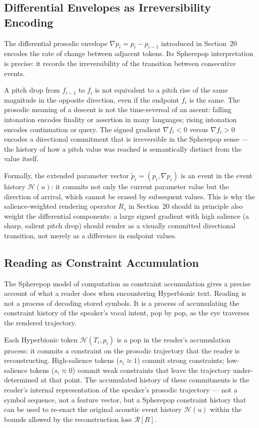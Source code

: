 \documentclass[12pt, a4paper]{article}
\begin{document}
\subsection{Differential Envelopes as Irreversibility Encoding}

The differential prosodic envelope $\nabla p_i = p_i - p_{i-1}$ introduced in Section~20 encodes the rate of change between adjacent tokens. Its Spherepop interpretation is precise: it records the irreversibility of the transition between consecutive events.

A pitch drop from $f_{i-1}$ to $f_i$ is not equivalent to a pitch rise of the same magnitude in the opposite direction, even if the endpoint $f_i$ is the same. The prosodic meaning of a descent is not the time-reversal of an ascent: falling intonation encodes finality or assertion in many languages; rising intonation encodes continuation or query. The signed gradient $\nabla f_i < 0$ versus $\nabla f_i > 0$ encodes a directional commitment that is irreversible in the Spherepop sense — the history of how a pitch value was reached is semantically distinct from the value itself.

Formally, the extended parameter vector $\tilde{p}_i = (p_i, \nabla p_i)$ is an event in the event history $\mathcal{H}(u)$: it commits not only the current parameter value but the direction of arrival, which cannot be erased by subsequent values. This is why the salience-weighted rendering operator $R_s$ in Section~20 should in principle also weight the differential components: a large signed gradient with high salience (a sharp, salient pitch drop) should render as a visually committed directional transition, not merely as a difference in endpoint values.

\subsection{Reading as Constraint Accumulation}

The Spherepop model of computation as constraint accumulation gives a precise account of what a reader does when encountering Hyperbionic text. Reading is not a process of decoding stored symbols. It is a process of accumulating the constraint history of the speaker's vocal intent, pop by pop, as the eye traverses the rendered trajectory.

Each Hyperbionic token $\mathcal{H}(T_i, p_i)$ is a pop in the reader's accumulation process: it commits a constraint on the prosodic trajectory that the reader is reconstructing. High-salience tokens ($s_i \approx 1$) commit strong constraints; low-salience tokens ($s_i \approx 0$) commit weak constraints that leave the trajectory under-determined at that point. The accumulated history of these commitments is the reader's internal representation of the speaker's prosodic trajectory — not a symbol sequence, not a feature vector, but a Spherepop constraint history that can be used to re-enact the original acoustic event history $\mathcal{H}(u)$ within the bounds allowed by the reconstruction loss $\mathcal{R}[R]$.
\end{document}
